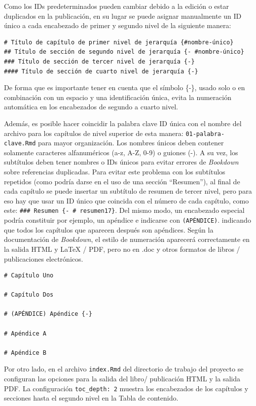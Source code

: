 \documentclass[
]{krantz}
\begin{document}
Como los IDs predeterminados pueden cambiar debido a la edición o estar duplicados en la publicación, en su lugar se puede asignar manualmente un ID único a cada encabezado de primer y segundo nivel de la siguiente manera:

\begin{verbatim}
# Título de capítulo de primer nivel de jerarquía {#nombre-único}
## Título de sección de segundo nivel de jerarquía {- #nombre-único}
### Título de sección de tercer nivel de jerarquía {-}
#### Título de sección de cuarto nivel de jerarquía {-}
\end{verbatim}

De forma que es importante tener en cuenta que el símbolo \{-\}, usado solo o en combinación con un espacio y una identificación única, evita la numeración automática en los encabezados de segundo a cuarto nivel.

Además, es posible hacer coincidir la palabra clave ID única con el nombre del archivo para los capítulos de nivel superior de esta manera: \texttt{01-palabra-clave.Rmd} para mayor organización. Los nombres únicos deben contener solamente caracteres alfanuméricos (a-z, A-Z, 0-9) o guiones (-). A su vez, los subtítulos deben tener nombres o IDs únicos para evitar errores de \emph{Bookdown} sobre referencias duplicadas. Para evitar este problema con los subtítulos repetidos (como podría darse en el uso de una sección ``Resumen''), al final de cada capítulo se puede insertar un subtítulo de resumen de tercer nivel, pero para eso hay que usar un ID único que coincida con el número de cada capítulo, como este: \texttt{\#\#\#\ Resumen\ \{-\ \#\ resumen17\}}. Del mismo modo, un encabezado especial podría constituir por ejemplo, un apéndice e indicarse con \texttt{(APÉNDICE)}. indicando que todos los capítulos que aparecen después son apéndices. Según la documentación de \emph{Bookdown}, el estilo de numeración aparecerá correctamente en la salida HTML y LaTeX / PDF, pero no en .doc y otros formatos de libros / publicaciones electrónicos.

\begin{verbatim}
# Capítulo Uno

# Capítulo Dos

# (APÉNDICE) Apéndice {-}

# Apéndice A

# Apéndice B
\end{verbatim}

Por otro lado, en el archivo \texttt{index.Rmd} del directorio de trabajo del proyecto se configuran las opciones para la salida del libro/ publicación HTML y la salida PDF. La configuración \texttt{toc\_depth:\ 2} muestra los encabezados de los capítulos y secciones hasta el segundo nivel en la Tabla de contenido.
\end{document}
